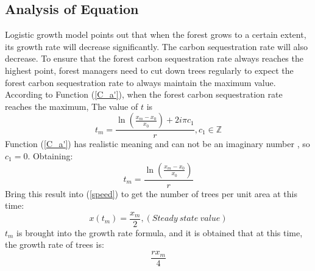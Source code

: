 \documentclass[12pt]{article}
\begin{document}
\subsection{Analysis of Equation}
Logistic growth model points out that when the forest grows to a certain
extent, its growth rate will decrease significantly.\cite{L1} The carbon
sequestration rate will also decrease. To ensure that the forest carbon
sequestration rate always reaches the highest point, forest managers need to
cut down trees regularly to expect the forest carbon sequestration rate to
always maintain the maximum value. According to Function (\ref{C_a'}), when the
forest carbon sequestration rate reaches the maximum, The value of $t$ is
\begin{equation}
    t_m=\frac{\ln \left(\frac{x_m-x_0}{x_0}\right)+2 i \pi  c_1}{r},c_1\in \mathbb{Z}
\end{equation}
Function (\ref{C_a'}) has realistic meaning and can not be an imaginary number , so $c_1=0$.
Obtaining:
\begin{equation}
    t_m=\frac{\ln \left(\frac{x_m-x_0}{x_0}\right)}{r}
\end{equation}
Bring this result into (\ref{speed}) to get the number of trees per unit area at this time:
\begin{equation}
    x(t_m)=\frac{x_m}{2},(Steady\ state\ value)
\end{equation}
$t_m$ is brought into the growth rate formula, and it is obtained that at this time, the growth rate of trees is:
\begin{equation}
    \frac{r x_m}{4}
\end{equation}
\end{document}
